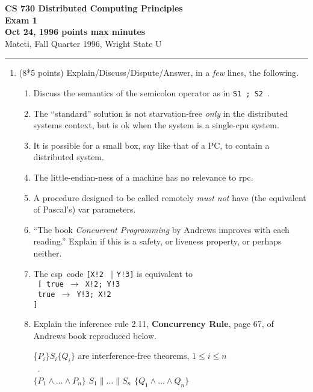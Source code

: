 \documentclass[12pt]{article}
\def\pr{$\parallel$}
\def\rar{$\rightarrow$}
\def\fat{\framebox[1mm]{\rule{0mm}{2mm}}}
\def\CSP{{\sc csp}}
\def\RPC{{\sc rpc}}
\def\co{{\bf co}}
\def\oc{{\bf oc}}
\def\zand{\wedge}\def\zor{\vee}	\def\znot{\neg}
\def\ellipsis{\ldots}
\def\pbar{\parallel}
\begin{document}
\pagestyle{empty}

{\bf CS
\large \bf 730 Distributed Computing Principles\\[5pt]
\large Exam 1\\[10pt]
Oct 24, 1996 points max  minutes\\
}
\bigskip
{Mateti,  Fall Quarter 1996, Wright State U}\\[-5pt]
\hrule

\begin{enumerate}

\item (8*5 points)
Explain/Discuss/Dispute/Answer, in a {\em few} lines, the following.

\begin{enumerate}
\item
Discuss the semantics of the semicolon operator as in {\tt S1 ; S2 }.

\item 
The ``standard'' solution  \noindent is not
starvation-free {\em only} in the distributed systems context, but is ok
when the system is a single-cpu system.

\item It is possible for a small box, say like that of a PC, to
contain a distributed system.

\item
The little-endian-ness of a machine has no relevance to \RPC.

\item
A procedure designed to be called remotely {\em must not} have
(the equivalent of Pascal's) var parameters.

\item
``The book {\em Concurrent Programming} by Andrews improves with each
reading.''  Explain if this is a safety, or liveness property, or
perhaps neither.

\item
The \CSP\ code {\tt [X!2 \pr Y!3]} is equivalent to \\
{\tt
[  true \rar\ X!2; Y!3\\
\fat\ true \rar\ Y!3; X!2\\
]}

\item
Explain the inference rule 2.11, {\bf Concurrency Rule}, page 67, of
Andrews book reproduced below.\\

\begin{centering}
\{$P_i\} S_i \{Q_i\}$ are interference-free theorems, $1 \leq i \leq
n$\\[-8pt]
~.\hrulefill\\[-4pt]
$\{P_1 \zand \ellipsis \zand P_n\}$
\quad\co\quad $S_1 \pbar \ellipsis \pbar S_n$ \quad\oc\quad
$\{Q_1 \zand \ellipsis \zand Q_n\}$\par
\end{centering}


\end{enumerate}
\end{enumerate}
\end{document}
